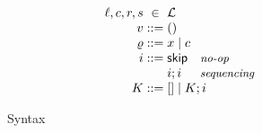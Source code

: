 \begin{figure}[!ht]
\newcommand{\commentary}[1]{ & \text{\small\it #1} \\}
\[
  \begin{array}{r@{\;}c@{\;}l}
    \loc, \sloc, \src, \dst & \in & \Loc \\
    \val & ::= & \vunit

\\

    \lval & ::= & \var \mid \sloc \\

    \instr & ::= &
    \begin{array}[t]{@{}l@{\hspace{10mm}}l@{}}
    \begin{array}[t]{@{}ll@{}}
      \iskip
                   \commentary{no-op}
      \iseq\instr\instr
                   \commentary{sequencing}
    \end{array}
    \end{array}
    \\

    \ectx & ::= &
      \hole \mid
      \iseq\ectx\instr 
    \\
  \end{array}
\]
\caption{Syntax}
\label{fig:syntax}
\end{figure}
